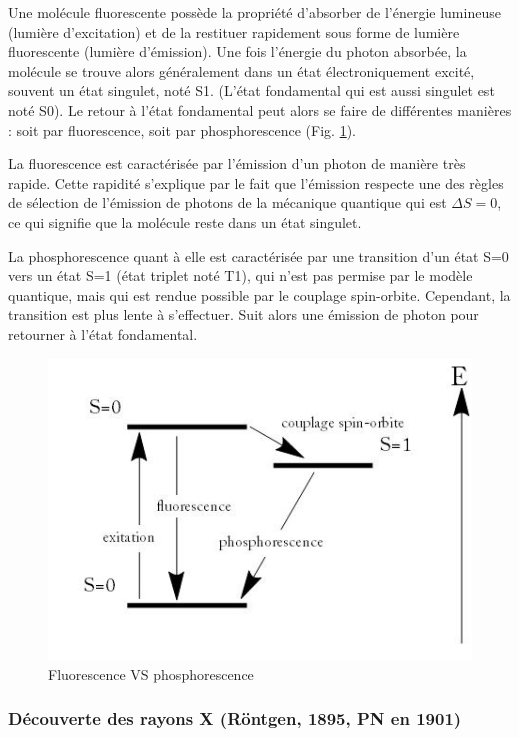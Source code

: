 Une molécule fluorescente possède la propriété d'absorber de l'énergie lumineuse (lumière d'excitation) et de la restituer rapidement sous forme de lumière fluorescente (lumière d'émission). Une fois l'énergie du photon absorbée, la molécule se trouve alors généralement dans un état électroniquement excité, souvent un état singulet, noté S1. (L'état fondamental qui est aussi singulet est noté S0). Le retour à l'état fondamental peut alors se faire de différentes manières : soit par fluorescence, soit par phosphorescence (Fig. \ref{fig:fluorescence_phosphorescence}).

La fluorescence est caractérisée par l'émission d'un photon de manière très rapide. Cette rapidité s'explique par le fait que l'émission respecte une des règles de sélection de l'émission de photons de la mécanique quantique qui est $\Delta S=0$, ce qui signifie que la molécule reste dans un état singulet.

La phosphorescence quant à elle est caractérisée par une transition d'un état S=0 vers un état S=1 (état triplet noté T1), qui n'est pas permise par le modèle quantique, mais qui est rendue possible par le couplage spin-orbite. Cependant, la transition est plus lente à s'effectuer. Suit alors une émission de photon pour retourner à l'état fondamental.

\begin{figure}[ht]
    \centering
    \includegraphics[scale=0.65]{Images1/fluophospho.jpg}
    \caption{Fluorescence VS phosphorescence}
    \label{fig:fluorescence_phosphorescence}
\end{figure}


\subsubsection{Découverte des rayons X (Röntgen, 1895, PN en 1901)}

